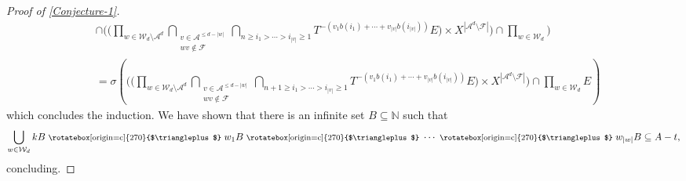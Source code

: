 \documentclass[letter,11pt]{article}
\theoremstyle{definition}
\newcommand{\N}{\mathbb{N}}
\newcommand{\sF}{\mathcal{F}}
\newcommand{\sA}{\mathcal{A}}
\newcommand{\gec}{\text{\footnotesize~\rotatebox[origin=c]{270}{$\triangleplus$}~}}
\begin{document}
\begin{proof}[{Proof of \cref{Conjecture-1}}]
\begin{align*}
     &\cap \Big( \Big(  \prod_{w\in \mathcal{W}_{d}\setminus\sA^d}  \bigcap_{\substack{v\in \mathcal{A}^{\leq d-|w|}\\ wv\notin\sF}}\bigcap_{n\geq i_{1}>\cdots >i_{|v|}\geq 1} T^{-(v_1b(i_{1})+\cdots +v_{|v|}b(i_{|v|}))}E\Big) \times X^{|\mathcal{A}^d\setminus\sF|} \Big)\cap \prod_{w\in \mathcal{W}_d} \Bigg)\\
     &= \sigma\left(\Bigg(\Big(  \prod_{w\in \mathcal{W}_{d}\setminus\sA^d}  \bigcap_{\substack{v\in \mathcal{A}^{\leq d-|w|}\\ wv\notin\sF}}\bigcap_{n+1\geq i_{1}>\cdots >i_{|v|}\geq 1} T^{-(v_1b(i_{1})+\cdots +v_{|v|}b(i_{|v|}))}E \Big)\times X^{|\mathcal{A}^d\setminus\sF|} \Bigg)\cap  \prod_{w\in \mathcal{W}_d} E  \right)
 \end{align*}
which concludes the induction. We have shown that there is an infinite set $B\subseteq \N$ such that 
\begin{equation*}
   \bigcup_{w\in \mathcal{W}_d}  kB\gec w_1B \gec \cdots \gec w_{|w|}B\subseteq A-t,
\end{equation*}
concluding.
\end{proof}
\end{document}

